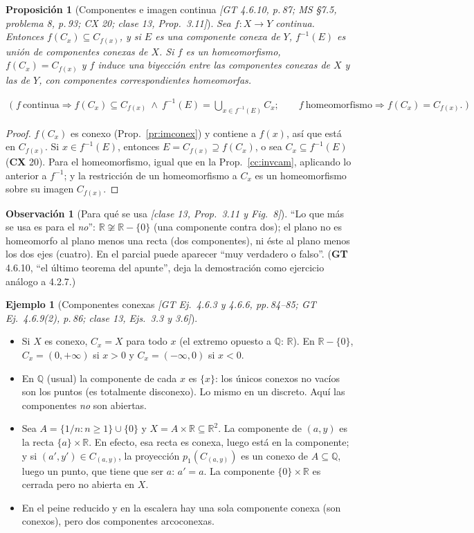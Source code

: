 \documentclass[11pt,a4paper]{article}
\newenvironment{lista}{\leavevmode\begin{itemize}[leftmargin=1.5em,itemsep=1pt,topsep=2pt,parsep=0pt]}{\end{itemize}}
\newcommand{\lgc}[1]{\par\vspace{-3pt}\begin{gather*}\big(\;#1\;\big)\end{gather*}\vspace{-6pt}}
\theoremstyle{definition}
\newtheorem{ejemplo}[definicion]{Ejemplo}
\newtheorem{observacion}[definicion]{Observación}
\theoremstyle{plain}
\newtheorem{proposicion}[definicion]{Proposición}
\newcommand{\fnt}[1]{{\normalfont\small\itshape\color{gray!150!black}[#1]}}
\newcommand{\R}{\mathbb{R}}
\newcommand{\Q}{\mathbb{Q}}
\begin{document}
\begin{proposicion}[Componentes e imagen continua \fnt{GT 4.6.10, p.\,87; MS \S7.5, problema 8, p.\,93; CX 20; clase 13, Prop.\ 3.11}]\label{cc:invcomp}
Sea $f:X\to Y$ continua. Entonces $f(C_x)\subseteq C_{f(x)}$, y si $E$ es una componente conexa de $Y$, $f^{-1}(E)$ es unión de componentes conexas de $X$. Si $f$ es un homeomorfismo, $f(C_x)=C_{f(x)}$ y $f$ induce una biyección entre las componentes conexas de $X$ y las de $Y$, con componentes correspondientes homeomorfas.
\lgc{f\ \text{continua}\Rightarrow f(C_x)\subseteq C_{f(x)}\ \wedge\ f^{-1}(E)=\bigcup_{x\in f^{-1}(E)}C_x;\qquad f\ \text{homeomorfismo}\Rightarrow f(C_x)=C_{f(x)}.}
\end{proposicion}

\begin{proof}
$f(C_x)$ es conexo (Prop.~\ref{pr:imconex}) y contiene a $f(x)$, así que está en $C_{f(x)}$. Si $x\in f^{-1}(E)$, entonces $E=C_{f(x)}\supseteq f(C_x)$, o sea $C_x\subseteq f^{-1}(E)$ (\textbf{CX} 20). Para el homeomorfismo, igual que en la Prop.~\ref{cc:invcam}, aplicando lo anterior a $f^{-1}$; y la restricción de un homeomorfismo a $C_x$ es un homeomorfismo sobre su imagen $C_{f(x)}$.
\end{proof}

\begin{observacion}[Para qué se usa \fnt{clase 13, Prop.\ 3.11 y Fig.\ 8}]
``Lo que más se usa es para el \emph{no}'': $\R\not\cong\R-\{0\}$ (una componente contra dos); el plano no es homeomorfo al plano menos una recta (dos componentes), ni éste al plano menos los dos ejes (cuatro). En el parcial puede aparecer ``muy verdadero o falso''. (\textbf{GT} 4.6.10, ``el último teorema del apunte'', deja la demostración como ejercicio análogo a 4.2.7.)
\end{observacion}

\begin{ejemplo}[Componentes conexas \fnt{GT Ej.\ 4.6.3 y 4.6.6, pp.\,84--85; GT Ej.\ 4.6.9(2), p.\,86; clase 13, Ejs.\ 3.3 y 3.6}]\label{cc:ejcomp}
\begin{lista}
\item Si $X$ es conexo, $C_x=X$ para todo $x$ (el extremo opuesto a $\Q$: $\R$). En $\R-\{0\}$, $C_x=(0,+\infty)$ si $x>0$ y $C_x=(-\infty,0)$ si $x<0$.
\item En $\Q$ (usual) la componente de cada $x$ es $\{x\}$: los únicos conexos no vacíos son los puntos (es totalmente disconexo). Lo mismo en un discreto. Aquí las componentes \emph{no} son abiertas.
\item Sea $A=\{1/n: n\ge1\}\cup\{0\}$ y $X=A\times\R\subseteq\R^2$. La componente de $(a,y)$ es la recta $\{a\}\times\R$. En efecto, esa recta es conexa, luego está en la componente; y si $(a',y')\in C_{(a,y)}$, la proyección $p_1(C_{(a,y)})$ es un conexo de $A\subseteq\Q$, luego un punto, que tiene que ser $a$: $a'=a$. La componente $\{0\}\times\R$ es cerrada pero no abierta en $X$.
\item En el peine reducido y en la escalera hay una sola componente conexa (son conexos), pero dos componentes arcoconexas.
\end{lista}
\end{ejemplo}
\end{document}
